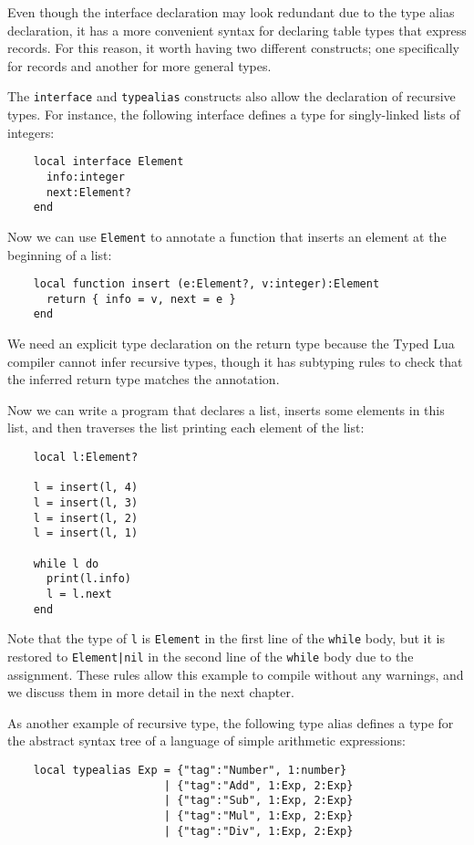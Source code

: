 Even though the interface declaration may look redundant due to
the type alias declaration, it has a more convenient syntax
for declaring table types that express records.
For this reason, it worth having two different constructs;
one specifically for records and another for more general types.

The \texttt{interface} and \texttt{typealias} constructs also allow
the declaration of recursive types.
For instance, the following interface defines a type for singly-linked
lists of integers:
\begin{verbatim}
    local interface Element
      info:integer
      next:Element?
    end
\end{verbatim}

Now we can use \texttt{Element} to annotate a function that
inserts an element at the beginning of a list:
\begin{verbatim}
    local function insert (e:Element?, v:integer):Element 
      return { info = v, next = e }
    end
\end{verbatim}

We need an explicit type declaration on the return type because
the Typed Lua compiler cannot infer recursive types, though
it has subtyping rules to check that the inferred return type
matches the annotation.

Now we can write a program that declares a list, inserts some
elements in this list, and then traverses the list printing
each element of the list:
\begin{verbatim}
    local l:Element?

    l = insert(l, 4)
    l = insert(l, 3)
    l = insert(l, 2)
    l = insert(l, 1)

    while l do
      print(l.info)
      l = l.next
    end
\end{verbatim}

Note that the type of \texttt{l} is \texttt{Element} in the
first line of the \texttt{while} body, but it is restored to
\texttt{Element|nil} in the second line of the \texttt{while} body
due to the assignment.
These rules allow this example to compile without any warnings,
and we discuss them in more detail in the next chapter.

As another example of recursive type, the following type alias
defines a type for the abstract syntax tree of a language of simple
arithmetic expressions:
\begin{verbatim}
    local typealias Exp = {"tag":"Number", 1:number}
                        | {"tag":"Add", 1:Exp, 2:Exp}
                        | {"tag":"Sub", 1:Exp, 2:Exp}
                        | {"tag":"Mul", 1:Exp, 2:Exp}
                        | {"tag":"Div", 1:Exp, 2:Exp}
\end{verbatim}

